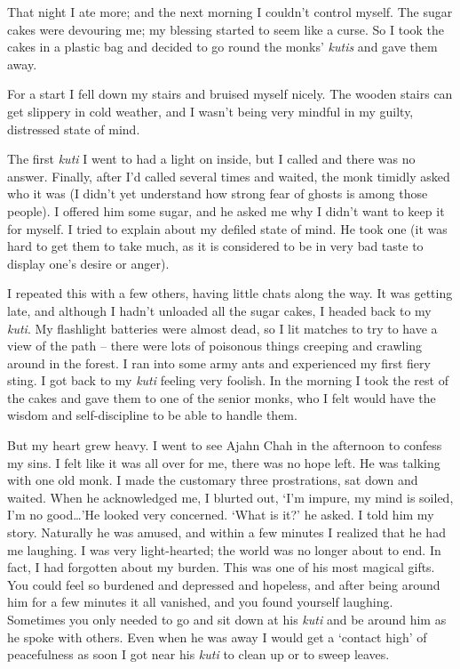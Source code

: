 That night I ate more; and the next morning I couldn't control myself. 
The sugar cakes were devouring me; my blessing started to seem like a
curse. So I took the cakes in a plastic bag and decided to go round the
monks' \emph{kutis} and gave them away. 

For a start I fell down my stairs and bruised myself nicely. The wooden
stairs can get slippery in cold weather, and I wasn't being very mindful
in my guilty, distressed state of mind. 

The first \emph{kuti} I went to had a light on inside, but I called and
there was no answer. Finally, after I'd called several times and waited, 
the monk timidly asked who it was (I didn't yet understand how strong
fear of ghosts is among those people). I offered him some sugar, and he
asked me why I didn't want to keep it for myself. I tried to explain
about my defiled state of mind. He took one (it was hard to get them to
take much, as it is considered to be in very bad taste to display one's
desire or anger). 

I repeated this with a few others, having little chats along the way. It
was getting late, and although I hadn't unloaded all the sugar cakes, I
headed back to my \emph{kuti}. My flashlight batteries were almost dead, 
so I lit matches to try to have a view of the path -- there were lots of
poisonous things creeping and crawling around in the forest. I ran into
some army ants and experienced my first fiery sting. I got back to my
\emph{kuti} feeling very foolish. In the morning I took the rest of the
cakes and gave them to one of the senior monks, who I felt would have
the wisdom and self-discipline to be able to handle them. 

But my heart grew heavy. I went to see Ajahn Chah in the afternoon to
confess my sins. I felt like it was all over for me, there was no hope
left. He was talking with one old monk. I made the customary three
prostrations, sat down and waited. When he acknowledged me, I blurted
out, `I'm impure, my mind is soiled, I'm no good\ldots{}'He looked very
concerned. `What is it?' he asked. I told him my story. Naturally he was
amused, and within a few minutes I realized that he had me laughing. I
was very light-hearted; the world was no longer about to end. In fact, I
had forgotten about my burden. This was one of his most magical gifts. 
You could feel so burdened and depressed and hopeless, and after being
around him for a few minutes it all vanished, and you found yourself
laughing. Sometimes you only needed to go and sit down at his
\emph{kuti} and be around him as he spoke with others. Even when he was
away I would get a `contact high' of peacefulness as soon I got near his
\emph{kuti} to clean up or to sweep leaves. 

